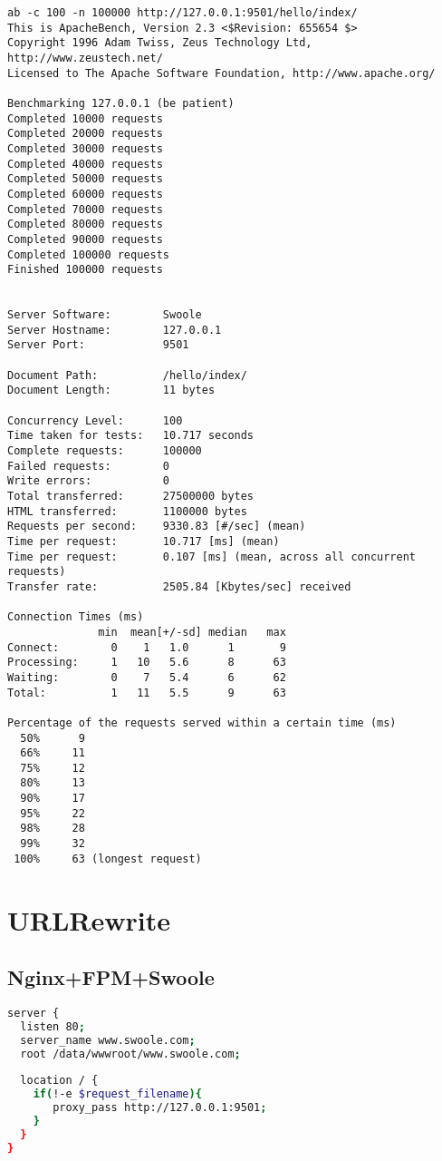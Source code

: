 \begin{lstlisting}
ab -c 100 -n 100000 http://127.0.0.1:9501/hello/index/
This is ApacheBench, Version 2.3 <$Revision: 655654 $>
Copyright 1996 Adam Twiss, Zeus Technology Ltd, http://www.zeustech.net/
Licensed to The Apache Software Foundation, http://www.apache.org/

Benchmarking 127.0.0.1 (be patient)
Completed 10000 requests
Completed 20000 requests
Completed 30000 requests
Completed 40000 requests
Completed 50000 requests
Completed 60000 requests
Completed 70000 requests
Completed 80000 requests
Completed 90000 requests
Completed 100000 requests
Finished 100000 requests


Server Software:        Swoole
Server Hostname:        127.0.0.1
Server Port:            9501

Document Path:          /hello/index/
Document Length:        11 bytes

Concurrency Level:      100
Time taken for tests:   10.717 seconds
Complete requests:      100000
Failed requests:        0
Write errors:           0
Total transferred:      27500000 bytes
HTML transferred:       1100000 bytes
Requests per second:    9330.83 [#/sec] (mean)
Time per request:       10.717 [ms] (mean)
Time per request:       0.107 [ms] (mean, across all concurrent requests)
Transfer rate:          2505.84 [Kbytes/sec] received

Connection Times (ms)
              min  mean[+/-sd] median   max
Connect:        0    1   1.0      1       9
Processing:     1   10   5.6      8      63
Waiting:        0    7   5.4      6      62
Total:          1   11   5.5      9      63

Percentage of the requests served within a certain time (ms)
  50%      9
  66%     11
  75%     12
  80%     13
  90%     17
  95%     22
  98%     28
  99%     32
 100%     63 (longest request)
\end{lstlisting}





\section{URLRewrite}


\subsection{Nginx+FPM+Swoole}



\begin{lstlisting}[language=bash]
server {
  listen 80;
  server_name www.swoole.com;
  root /data/wwwroot/www.swoole.com;
  
  location / {
    if(!-e $request_filename){
       proxy_pass http://127.0.0.1:9501;
    }
  }
}
\end{lstlisting}


